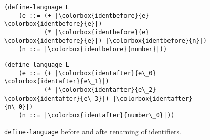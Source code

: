 \begin{figure}[h]
	\begin{minipage}{0.5\linewidth}
		\centering
		\begin{verbatim}
(define-language L
	(e ::= (+ |\colorbox{identbefore}{e} \colorbox{identbefore}{e}|) 
	       (* |\colorbox{identbefore}{e} \colorbox{identbefore}{e}|) |\colorbox{identbefore}{n}|)
	(n ::= |\colorbox{identbefore}{number}|))
		\end{verbatim}
	\end{minipage}
	\begin{minipage}{0.5\linewidth}
		\centering
		\begin{verbatim}
(define-language L
	(e ::= (+ |\colorbox{identafter}{e\_0} \colorbox{identafter}{e\_1}|) 
	       (* |\colorbox{identafter}{e\_2} \colorbox{identafter}{e\_3}|) |\colorbox{identafter}{n\_0}|)
	(n ::= |\colorbox{identafter}{number\_0}|))
		\end{verbatim}
	\end{minipage}
	\caption{\texttt{define-language} before and afte renaming of identifiers.}
	\label{id-rewrite-example}
\end{figure}


